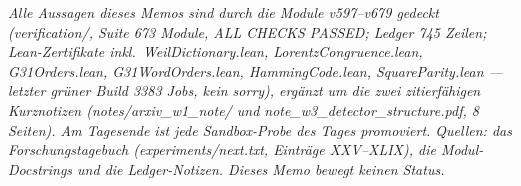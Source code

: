 \documentclass[11pt,a4paper]{article}
\begin{document}
\vspace{0.5em}
\begin{center}
\small\itshape
Alle Aussagen dieses Memos sind durch die Module v597--v679 gedeckt
(verification/, Suite 673 Module, ALL CHECKS PASSED; Ledger 745
Zeilen; Lean-Zertifikate inkl.\ WeilDictionary.lean,
LorentzCongruence.lean, G31Orders.lean, G31WordOrders.lean,
HammingCode.lean, SquareParity.lean --- letzter grüner Build 3383
Jobs, kein sorry), ergänzt um die zwei zitierfähigen Kurznotizen
(notes/arxiv\_w1\_note/ und note\_w3\_detector\_structure.pdf, 8
Seiten). Am Tagesende ist jede Sandbox-Probe des Tages promoviert.
Quellen: das Forschungstagebuch (experiments/next.txt, Einträge
XXV--XLIX), die Modul-Docstrings und die Ledger-Notizen. Dieses
Memo bewegt keinen Status.
\end{center}
\end{document}
